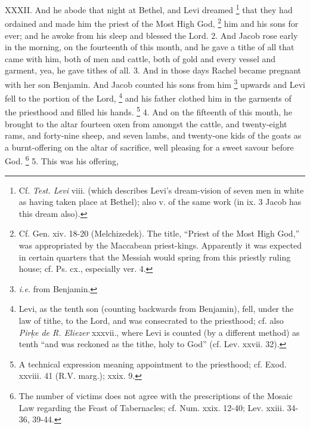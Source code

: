 XXXII. And he abode that night at Bethel, and Levi dreamed \footnote{Cf. \emph{Test. Levi} viii. (which describes Levi's dream-vision of seven men in white as having taken place at Bethel); also v. of the same work (in ix. 3 Jacob has this dream also).} that they had ordained and made him the priest of the Most High God, \footnote{Cf. Gen. xiv. 18-20 (Melchizedek). The title, ``Priest of the Most High God,'' was appropriated by the Maccabean priest-kings. Apparently it was expected in certain quarters that the Messiah would spring from this priestly ruling house; cf. Ps. cx., especially ver. 4.} him and his sons for ever; and he awoke from his sleep and blessed the Lord. 2. And Jacob rose early in the morning, on the fourteenth of this month, and he gave a tithe of all that came with him, both of men and cattle, both of gold and every vessel and garment, yea, he gave tithes of all. 3. And in those days Rachel became pregnant with her son Benjamin. And Jacob counted his sons from him \footnote{\emph{i.e.} from Benjamin.} upwards and Levi fell to the portion of the Lord, \footnote{Levi, as the tenth son (counting backwards from Benjamin), fell, under the law of tithe, to the Lord, and was consecrated to the priesthood; cf. also \emph{Pir\d{k}e de R. Eliezer} xxxvii., where Levi is counted (by a different method) as tenth ``and was reckoned as the tithe, holy to God'' (cf. Lev. xxvii. 32).} and his father clothed him in the garments of the priesthood and filled his hands. \footnote{A technical expression meaning appointment to the priesthood; cf. Exod. xxviii. 41 (R.V. marg.); xxix. 9.} 4. And on the fifteenth of this month, he brought to the altar fourteen oxen from amongst the cattle, and twenty-eight rams, and forty-nine sheep, and seven lambs, and twenty-one kids of the goats as a burnt-offering on the altar of sacrifice, well pleasing for a sweet savour before God. \footnote{The number of victims does not agree with the prescriptions of the Mosaic Law regarding the Feast of Tabernacles; cf. Num. xxix. 12-40; Lev. xxiii. 34-36, 39-44.} 5. This was his offering,

